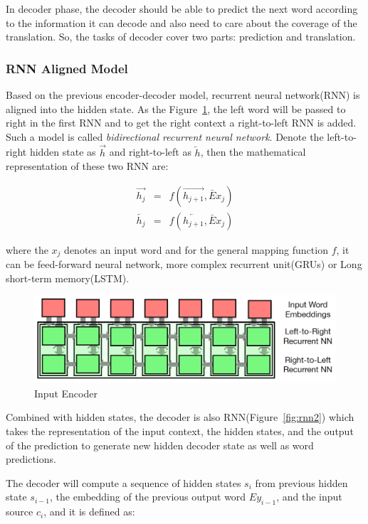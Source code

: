 \documentclass[a4paper, 12pt]{article}
\begin{document}
In decoder phase, the decoder should be able to predict the next word according to the information it can decode and also need to care about the coverage of the translation. So, the tasks of decoder cover two parts: prediction and translation.
  
\subsubsection{RNN Aligned Model}
Based on the previous encoder-decoder model, recurrent neural network(RNN) is aligned into the hidden state\cite{koehn2017neural}. As the Figure~\ref{fig:rnn}, the left word will be passed to right in the first RNN and to get the right context a right-to-left RNN is added. Such a model is called \textsl{bidirectional recurrent neural network}. Denote the left-to-right hidden state as $\overrightarrow{h}$ and right-to-left as $\overleftarrow{h}$, then the mathematical representation of these two RNN are:

$$
\begin{array}{rcl}
\overrightarrow{h_j}&=&f(\overrightarrow{h_{j+1}}, \bar{E} x_j)\\
\overleftarrow{h_j}&=&f(\overleftarrow{h_{j+1}}, \bar{E} x_j)
\end{array}
$$

where the $x_j$ denotes an input word and for the general mapping function $f$, it can be feed-forward neural network, more complex recurrent unit(GRUs) or Long short-term memory(LSTM).

\begin{figure}
\centering
\includegraphics[scale=0.7]{rnn.png}
\caption{\label{fig:rnn}Input Encoder}
\end{figure}

Combined with hidden states, the decoder is also RNN(Figure~\ref{fig:rnn2}) which takes the representation of the input context, the hidden states, and the output of the prediction to generate new hidden decoder state as well as word predictions. 

The decoder will compute a sequence of hidden states $s_i$ from previous hidden state $s_{i-1}$, the embedding of the previous output word $Ey_{i-1}$, and the input source $c_i$, and it is defined as:
\end{document}
